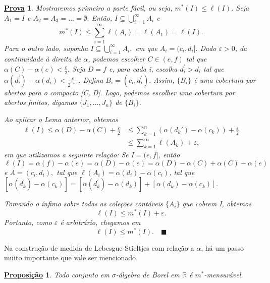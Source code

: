 \documentclass{article}
\newtheorem*{prop*}{\underline{Proposi\c c\~ao}}
\newtheorem*{proof*}{\underline{Prova}}
\renewcommand\qedsymbol{$\blacksquare$}
\begin{document}
\begin{proof*}
	Mostraremos primeiro a parte fácil, ou seja, \(m^{*}(I) \leq \ell (I)\). Seja \(A_{1} = I\) e \(A_2 = A_3 = \dotsc = \emptyset .\) Então, \(I\subseteq \bigcup_{i=1}^{\infty}A_{i}\) e
	\[
		m^{*}(I) \leq \sum\limits_{i=1}^{\infty}\ell (A_{i}) = \ell (A_1) = \ell (I).
	\]
	Para o outro lado, suponha \(I\subseteq \bigcup_{i=1}^{\infty}A_{i},\) em que \(A_{i} = (c_{i}, d_{i}].\) Dado \(\varepsilon > 0\), da continuidade à direita de \(\alpha \), podemos escolher
	\(C\in (e, f)\) tal que \(\alpha (C) - \alpha (e) < \frac{\varepsilon }{2}.\) Seja \(D = f\) e, para cada i, escolha \(d_{i}^\prime > d_{i}\) tal que \(\alpha (d_{i}^\prime) - \alpha (d_{i}) < \frac{\varepsilon }{2^{i+1}}.\) Defina
	\(B_{i} = (c_{i}, d_{i}^\prime).\) Assim, \(\{B_{i}\}\) é uma cobertura por abertos para o compacto [C, D]. Logo, podemos escolher uma cobertura por abertos finitos, digamos \(\{J_{1}, \dotsc , J_{n}\}\) de \(\{B_{i}\}\).

	Ao aplicar o Lema anterior, obtemos
	\begin{align*}
		\ell (I) \leq \alpha (D) - \alpha (C) + \frac{\varepsilon }{2} & \leq \sum\limits_{k=1}^{n}(\alpha (d_{k}\prime) - \alpha (c_{k})) + \frac{\varepsilon }{2} \\
		                                                               & \leq \sum\limits_{k=1}^{\infty}\ell (A_{k}) + \varepsilon,
	\end{align*}
	em que utilizamos a seguinte relação: Se \(I = (e, f]\), então \(\ell (I) = \alpha (f) - \alpha (e) = \alpha (D) - \alpha (e) = \alpha (D) - \alpha (C) + \alpha (C) - \alpha (e)\) e \(A = (c_{i}, d_{i}),\) tal que
	\(\ell (A_{i}) = \alpha (d_{i}) - \alpha (c_{i})\), tal que \([\alpha (d_{k}^\prime) - \alpha (c_{k})]  = [\alpha (d_{k}^{\prime}) - \alpha (d_{k})] + [ \alpha (d_{k}) - \alpha (c_{k})] .\)

	Tomando o ínfimo sobre todas as coleções contáveis \(\{A_{i}\}\) que cobrem I, obtemos
	\[
		\ell (I) \leq m^{*}(I) + \varepsilon .
	\]
	Portanto, como \(\varepsilon \) é arbitrário, chegamos em
	\[
		\ell (I) \leq m^{*}(I).\quad \text{\qedsymbol}
	\]
\end{proof*}
Na construção de medida de Lebesgue-Stieltjes com relação a \(\alpha \), há um passo muito importante que vale ser mencionado.
\begin{prop*}
	Todo conjunto em \(\sigma \)-álgebra de Borel em \(\mathbb{R}\) é \(m^{*}\)-mensurável.
\end{prop*}
\end{document}
